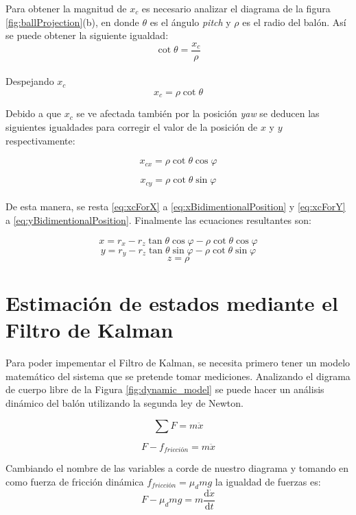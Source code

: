 Para obtener la magnitud de $x_c$ es necesario analizar el diagrama de la figura \ref{fig:ballProjection}(b), en donde $\theta$ es el ángulo \textit{pitch} y $\rho$ es el radio del balón. Así se puede obtener la siguiente igualdad:
\[\cot{\theta} = \frac{x_c}{\rho}\]\\

Despejando $x_c$
\[x_c = \rho \cot{\theta}\]

Debido a que $x_c$ se ve afectada también por la posición \textit{yaw} se deducen las siguientes igualdades para corregir el valor de la posición de $x$ y $y$ respectivamente:

\begin{equation}
\label{eq:xcForX}
x_{cx} = \rho \cot{\theta} \cos{\varphi}
\end{equation}

\begin{equation}
\label{eq:xcForY}
x_{cy} = \rho \cot{\theta} \sin{\varphi}
\end{equation}\\

De esta manera, se resta \ref{eq:xcForX}  a \ref{eq:xBidimentionalPosition} y \ref{eq:xcForY} a \ref{eq:yBidimentionalPosition}. Finalmente las ecuaciones resultantes son:

\[x = r_x - r_z \tan{\theta} \cos{\varphi} - \rho \cot{\theta} \cos{\varphi}\]
\[y = r_y - r_z \tan{\theta} \sin{\varphi} - \rho \cot{\theta} \sin{\varphi}\]
\[z = \rho \]


		
	\section{Estimación de estados mediante el Filtro de Kalman}
	Para poder impementar el Filtro de Kalman, se necesita primero tener un modelo matemático del sistema que se pretende tomar mediciones. Analizando el digrama de cuerpo libre de la Figura \ref{fig:dynamic_model} se puede hacer un análisis dinámico del balón utilizando la segunda ley de Newton.

\begin{equation}
\sum F = m \ddot{x}
\label{eq:second_law}
\end{equation}

\begin{equation}
F-f_{fricción} = m \ddot{x}
\label{eq:equivalency_1}
\end{equation}

Cambiando el nombre de las variables a corde de nuestro diagrama y tomando en como fuerza de fricción dinámica $f_{fricción} = \mu_d m g $ la igualdad de fuerzas es:
\begin{equation}
F- \mu_d m g = m  \frac{\mathrm{d} \dot{x}}{\mathrm{d} t}
\label{eq:equivalency_2}
\end{equation}
	
